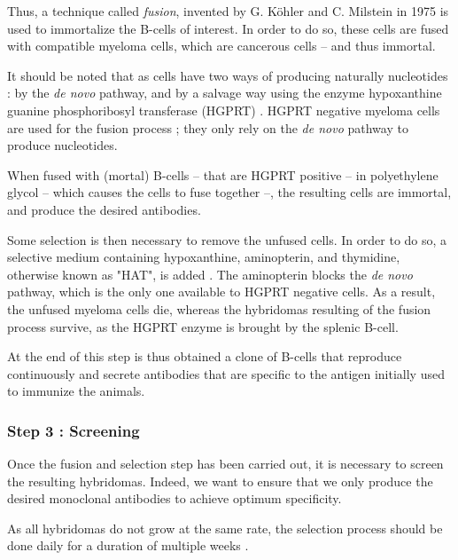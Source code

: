 Thus, a technique called \emph{fusion}, invented by G. Köhler and
C. Milstein in 1975 \cite{kohler_continuous_1975} is used to immortalize
the B-cells of interest. In order to do so, these cells are fused with
compatible myeloma cells, which are cancerous cells -- and thus immortal.

It should be noted that as cells have two ways of producing naturally
nucleotides : by the \emph{de novo} pathway, and by a salvage way using the enzyme
hypoxanthine guanine phosphoribosyl transferase (HGPRT) \cite{mckeran_use_1976}.
HGPRT negative myeloma cells are used for the fusion process ; they only rely
on the \emph{de novo} pathway to produce nucleotides.

When fused with (mortal) B-cells -- that are HGPRT positive --
in polyethylene glycol -- which causes the cells to fuse together --,
the resulting cells are immortal, and produce the desired antibodies.

Some selection is then necessary to remove the unfused cells. In order
to do so, a selective medium containing hypoxanthine, aminopterin, and 
thymidine, otherwise known as "HAT", is added \cite{nelson_monoclonal_2000}. 
The aminopterin blocks the \emph{de novo} pathway, which is the only one 
available to HGPRT negative cells. As a result, the unfused myeloma cells die,
whereas the hybridomas resulting of the fusion process survive, as the
HGPRT enzyme is brought by the splenic B-cell.

At the end of this step is thus obtained a clone of B-cells that reproduce
continuously and secrete antibodies that are specific to the antigen
initially used to immunize the animals.

\subsubsection{Step 3 : Screening}

Once the fusion and selection step has been carried out, it is necessary
to screen the resulting hybridomas. Indeed, we want to ensure that we
only produce the desired monoclonal antibodies to achieve optimum
specificity.

As all hybridomas do not grow at the same rate, the selection process
should be done daily for a duration of multiple weeks \cite{nelson_monoclonal_2000}.

